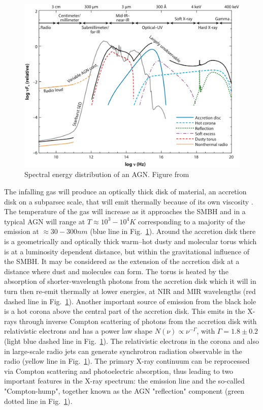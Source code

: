 \begin{figure}
\begin{center}
  \includegraphics[width=\textwidth]{Figs/Intro/Fig1_Hickox18.pdf}
  \vspace{-30pt}
  \caption{Spectral energy distribution of an AGN. Figure from \citet{2018ARA&A..56..625H}}
    \label{fig:AGN_SED}
\end{center}
\end{figure}

The infalling gas will produce an optically thick disk of material, an accretion disk on a subparsec scale, that will emit thermally because of its own viscosity \citep[e.g.][]{1973A&A....24..337S, 1984ARA&A..22..471R}. The temperature of the gas will increase as it approaches the SMBH and in a typical AGN will range at $T \approx 10^3-10^4 K$ corresponding to a majority of the emission at $\approx 30-300 nm$ (blue line in Fig.~\ref{fig:AGN_SED}).
Around the accretion disk there is a geometrically and optically thick warm–hot dusty and molecular torus which is at a luminosity dependent distance, but within the gravitational influence of the SMBH. It may be considered as the extension of the accretion disk at a distance where dust and molecules can form. The torus is heated by the absorption of shorter-wavelength photons from the accretion disk which it will in turn then re-emit thermally at lower energies, at NIR and MIR wavelengths (red dashed line in Fig.~\ref{fig:AGN_SED}).
Another important source of emission from the black hole is a hot corona above the central part of the accretion disk. This emits in the X-rays through inverse Compton scattering of photons from the accretion disk with relativistic electrons and has a power law shape $N(\nu)\propto \nu^{-\Gamma}$, with $\Gamma=1.8\pm0.2$ (light blue dashed line in Fig.~\ref{fig:AGN_SED}). 
The relativistic electrons in the corona and also in large-scale radio jets can generate synchrotron radiation observable in the radio (yellow line in Fig.~\ref{fig:AGN_SED}).
The primary X-ray continuum can be reprocessed via Compton scattering and photoelectric absorption, thus leading to two important features in the X-ray spectrum: the \kalfa{} emission line and the so-called "Compton-hump", together known as the AGN "reflection" component (green dotted line in Fig.~\ref{fig:AGN_SED}).

